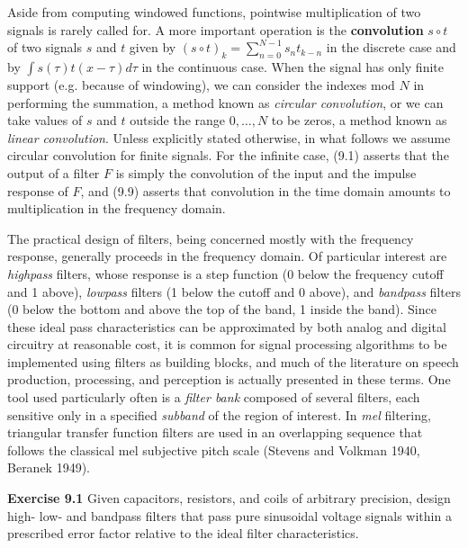 Aside from computing windowed functions, pointwise multiplication of two
signals is rarely called for. A more important operation is the {\bf
  convolution} $s\circ t$ of two signals $s$ and $t$
given by $(s\circ t)_k=\sum_{n=0}^{N-1} s_n t_{k-n}$ in the discrete case and
by $\int s(\tau) t(x-\tau)d\tau$ in the continuous case. When the signal has
only finite support (e.g. because of windowing), we can consider the indexes
mod $N$ in performing the summation, a method known as {\it circular
  convolution}, or we can take values of $s$ and $t$ outside the range
$0,\ldots, N$ to be zeros, a method known as {\it linear convolution}. Unless
explicitly stated otherwise, in what follows we assume circular convolution
for finite signals. For the infinite case, (9.1) asserts that the output of a
filter $F$ is simply the convolution of the input and the impulse response of
$F$, and (9.9) asserts that convolution in the time domain amounts to
multiplication in the frequency domain. 

The practical design of filters, being concerned mostly with the frequency
response, generally proceeds in the frequency domain. Of particular interest
are {\it highpass} filters, whose response is a step function (0 below the
frequency cutoff and 1 above), {\it lowpass} filters (1 below the cutoff and 0
above), and {\it bandpass} filters (0 below the bottom and above the top of
the band, 1 inside the band).
Since these ideal pass characteristics can be
approximated by both analog and digital circuitry at reasonable cost, it is
common for signal processing algorithms to be implemented using filters as
building blocks, and much of the literature on speech production, processing,
and perception is actually presented in these terms. One tool used
particularly often is a {\it filter bank}
composed of several filters, each sensitive only in a specified {\it
  subband} of the region of interest. In {\it mel} filtering,
triangular transfer function filters are used in an overlapping sequence that
follows the classical mel subjective pitch scale (Stevens and Volkman 1940,
Beranek 1949).\nocite{Stevens:1940}\nocite{Beranek:1949}

\smallskip
\noindent
{\bf Exercise 9.1} Given capacitors, resistors, and coils of arbitrary
precision, design high- low- and bandpass filters that pass pure sinusoidal
voltage signals within a prescribed error factor relative to the ideal filter
characteristics.


